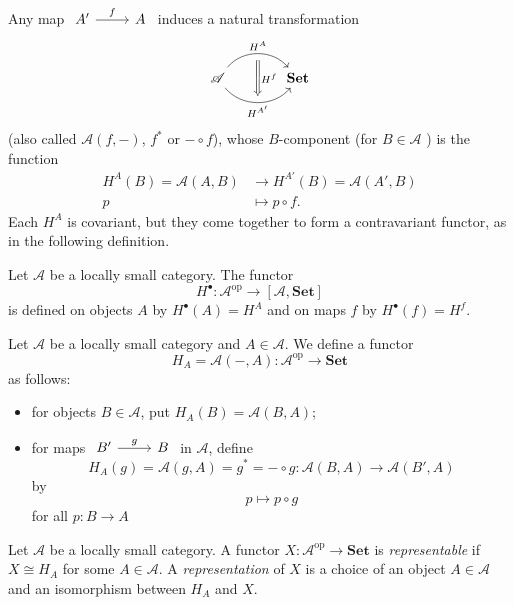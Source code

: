  Any map $
 \begin{tikzcd}
   A' \arrow[r,"f"] &A
 \end{tikzcd}$ induces a natural transformation
 \[
   \begin{tikzcd}[column sep=large]
     \mathscr{A}\arrow[r, bend left=50,"H^{A}",""{name=U,below}] \arrow[r, bend right=50, "H^{A'}"',""{name=D}] & \mathbf{Set} \arrow[Rightarrow, "H^{f}",from=U,to=D]  
 \end{tikzcd}
   \](also called $\mathscr{A}(f,-)$, $f^{*}$ or $-\circ f$), whose $B$-component (for $B \in \mathscr{A}$ ) is the function
   \begin{align*}
     H^{A}(B)=\mathscr{A}(A,B)&\to  H^{A'}(B)=\mathscr{A}(A',B)\\
     p&\mapsto  p\circ f
   .\end{align*} 
Each $H^{A}$ is covariant, but they come together to form a contravariant functor, as in the following definition.

\begin{definition}
  Let $\mathscr{A}$ be a locally small category. The functor 
  \[
    H^{\bullet}:\mathscr{A}^{\mathrm{op}}\to \left[ \mathscr{A},\mathbf{Set} \right] 		
  \] is defined on objects $A$ by $H^{\bullet}(A)=H^{A}$ and on maps $f$ by $H^{\bullet}(f)=H^{f}$.
\end{definition}

\begin{definition}
  Let $\mathscr{A}$ be a locally small category and $A\in \mathscr{A}$. We define a functor 
  \[
    H_A=\mathscr{A}(-,A):\mathscr{A}^{\mathrm{op}}\to \mathbf{Set}
  \] 
  as follows:
  \begin{itemize}
    \item for objects $B\in \mathscr{A}$, put $H_A(B)=\mathscr{A}(B,A)$;
    \item for maps  $
      \begin{tikzcd}
	B'\arrow[r,"g"] &B
      \end{tikzcd}$ in $\mathscr{A}$, define
      \[
	H_A(g)=\mathscr{A}(g,A)=g^{*}=-\circ g:\mathscr{A}(B,A)\to \mathscr{A}(B',A)
      \] by 
      \[
      p\mapsto p\circ g
      \] for all $p:B\to A$
  \end{itemize}
\end{definition}

\begin{definition}
  Let $\mathscr{A}$ be a locally small category. A functor $X:\mathscr{A}^{\mathrm{op}}\to \mathbf{Set}$ is \textit{representable} if $X\cong H_A$ for some $A\in \mathscr{A}$. A \textit{representation} of $X$ is a choice of an object $A\in \mathscr{A}$ and an isomorphism between $H_A$ and $X$.
\end{definition}

